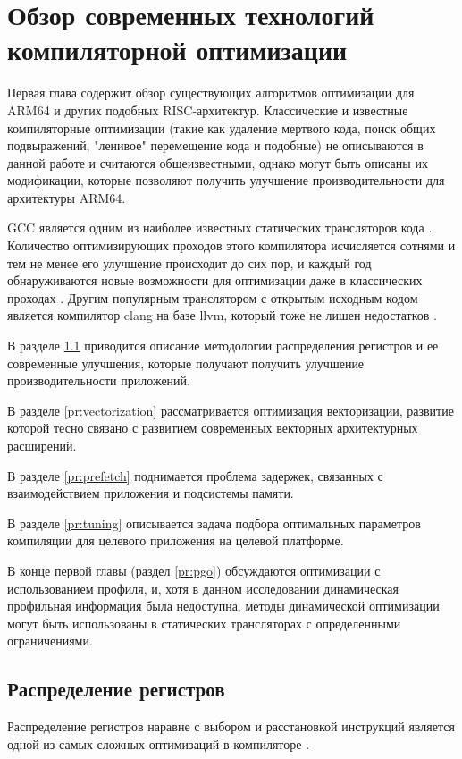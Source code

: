 \chapter{Обзор современных технологий компиляторной оптимизации}\label{ch:chReview}
Первая глава содержит обзор существующих алгоритмов оптимизации для ARM64 и других  подобных  RISC-архитектур. Классические и известные компиляторные оптимизации (такие как удаление мертвого кода, поиск общих подвыражений, "ленивое"\phantom{} перемещение кода и подобные) не описываются в данной работе и считаются общеизвестными, однако могут быть описаны их модификации, которые позволяют получить улучшение производительности для архитектуры ARM64. 

GCC является одним из наиболее известных статических трансляторов кода \cite{gough2004introduction}. Количество оптимизирующих проходов этого компилятора исчисляется сотнями и тем не менее его улучшение происходит до сих пор, и каждый год обнаруживаются новые возможности для оптимизации даже в классических проходах \cite{theodoridis2022finding}. Другим популярным транслятором с открытым исходным кодом является  компилятор clang на базе llvm, который тоже не лишен недостатков \cite{zhou2021empirical}.

В разделе \ref{pr:regalloc} приводится описание методологии распределения регистров и ее современные улучшения, которые получают получить улучшение производительности приложений.

В разделе \ref{pr:vectorization} рассматривается оптимизация векторизации, развитие которой тесно связано с развитием современных векторных архитектурных расширений.

В разделе \ref{pr:prefetch} поднимается проблема задержек, связанных с  взаимодействием приложения и подсистемы памяти.

В разделе \ref{pr:tuning} описывается задача подбора оптимальных параметров компиляции для целевого приложения на целевой платформе.

В конце первой главы (раздел \ref{pr:pgo}) обсуждаются оптимизации с использованием профиля, и, хотя в данном исследовании динамическая профильная информация была недоступна, методы динамической оптимизации могут быть использованы в статических трансляторах с определенными ограничениями.

\section{Распределение регистров} \label{pr:regalloc}
Распределение регистров наравне с выбором и расстановкой инструкций является одной из самых сложных оптимизаций в компиляторе \cite{lozano2019survey, alfred2007compilers}. 

